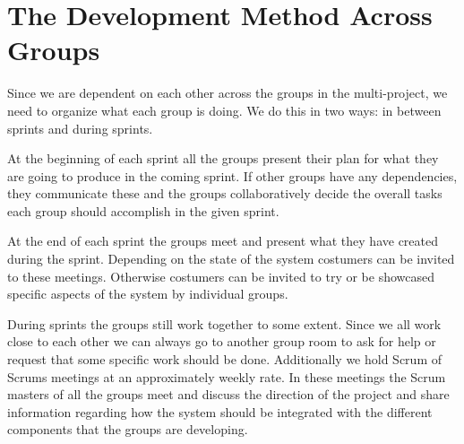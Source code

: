 \section{The Development Method Across Groups} %
Since we are dependent on each other across the groups in the multi-project, we need to organize what each group is doing.
We do this in two ways: in between sprints and during sprints.

At the beginning of each sprint all the groups present their plan for what they are going to produce in the coming sprint.
If other groups have any dependencies, they communicate these and the groups collaboratively decide the overall tasks each group should accomplish in the given sprint.

At the end of each sprint the groups meet and present what they have created during the sprint.
Depending on the state of the system costumers can be invited to these meetings.
Otherwise costumers can be invited to try or be showcased specific aspects of the system by individual groups.

During sprints the groups still work together to some extent.
Since we all work close to each other we can always go to another group room to ask for help or request that some specific work should be done.
Additionally we hold Scrum of Scrums meetings at an approximately weekly rate.
In these meetings the Scrum masters of all the groups meet and discuss the direction of the project and share information regarding how the system should be integrated with the different components that the groups are developing.
